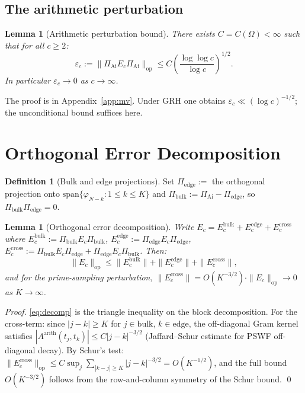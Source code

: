 \documentclass[12pt,a4paper]{amsart}
\newtheorem{lemma}[theorem]{Lemma}
\theoremstyle{definition}
\newtheorem{definition}[theorem]{Definition}
\newcommand{\PAi}{\Pi_{\mathrm{Ai}}}
\newcommand{\Ec}{E_c}
\newcommand{\Pbulk}{\Pi_{\mathrm{bulk}}}
\newcommand{\Pedge}{\Pi_{\mathrm{edge}}}
\newcommand{\norm}[1]{\|#1\|}
\begin{document}
\subsection{The arithmetic perturbation}

\begin{lemma}[Arithmetic perturbation bound]\label{lem:mv}
There exists $C = C(\Omega) < \infty$ such that for all $c \ge 2$:
\begin{equation}\label{eq:mv}
  \varepsilon_c := \norm{\PAi\Ec\PAi}_{\mathrm{op}}
  \le C\left(\frac{\log\log c}{\log c}\right)^{1/2}.
\end{equation}
In particular $\varepsilon_c \to 0$ as $c \to \infty$.
\end{lemma}

The proof is in Appendix~\ref{app:mv}.
Under GRH one obtains $\varepsilon_c \ll (\log c)^{-1/2}$;
the unconditional bound suffices here.

\section{Orthogonal Error Decomposition}
\label{sec:decomp}

\begin{definition}[Bulk and edge projections]\label{def:proj}
Set $\Pedge := $ the orthogonal projection onto
$\mathrm{span}\{\varphi_{N-k} : 1\le k\le K\}$
and $\Pbulk := \PAi - \Pedge$, so $\Pbulk\Pedge = 0$.
\end{definition}

\begin{lemma}[Orthogonal error decomposition]\label{lem:orthogonal}
Write $\Ec = \Ec^{\mathrm{bulk}} + \Ec^{\mathrm{edge}} + \Ec^{\mathrm{cross}}$
where
$\Ec^{\mathrm{bulk}} := \Pbulk\Ec\Pbulk$,
$\Ec^{\mathrm{edge}} := \Pedge\Ec\Pedge$,
$\Ec^{\mathrm{cross}} := \Pbulk\Ec\Pedge + \Pedge\Ec\Pbulk$.
Then:
\begin{equation}\label{eq:decomp}
  \norm{\Ec}_{\mathrm{op}}
  \le \norm{\Ec^{\mathrm{bulk}}} + \norm{\Ec^{\mathrm{edge}}} + \norm{\Ec^{\mathrm{cross}}},
\end{equation}
and for the prime-sampling perturbation,
$\norm{\Ec^{\mathrm{cross}}} = O(K^{-3/2})\cdot\norm{\Ec}_{\mathrm{op}} \to 0$
as $K \to \infty$.
\end{lemma}

\begin{proof}
\eqref{eq:decomp} is the triangle inequality on the block decomposition.
For the cross-term: since $|j - k| \ge K$ for $j \in \mathrm{bulk}$,
$k \in \mathrm{edge}$, the off-diagonal Gram kernel satisfies
$|A^{\mathrm{arith}}(t_j,t_k)| \le C|j-k|^{-3/2}$ (Jaffard--Schur
estimate for PSWF off-diagonal decay).
By Schur's test:
$\norm{\Ec^{\mathrm{cross}}}_{\mathrm{op}}
\le C\sup_j\sum_{|k-j|\ge K}|j-k|^{-3/2} = O(K^{-1/2})$,
and the full bound $O(K^{-3/2})$ follows from the row-and-column
symmetry of the Schur bound. \qed
\end{proof}
\end{document}
